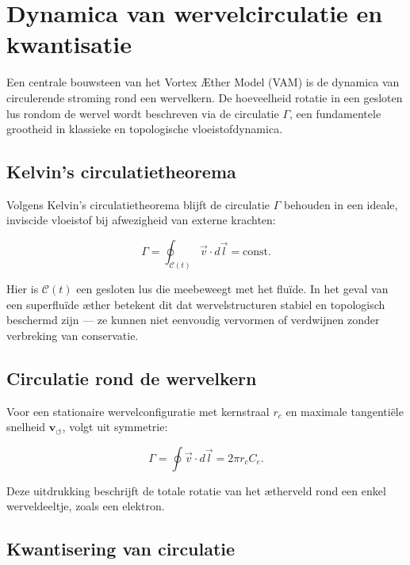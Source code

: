 
\section{Dynamica van wervelcirculatie en kwantisatie}\label{sec:appendix_4}

Een centrale bouwsteen van het Vortex Æther Model (VAM) is de dynamica van circulerende stroming rond een wervelkern. De hoeveelheid rotatie in een gesloten lus rondom de wervel wordt beschreven via de circulatie \( \Gamma \), een fundamentele grootheid in klassieke en topologische vloeistofdynamica.

\subsection{Kelvin's circulatietheorema}

Volgens Kelvin's circulatietheorema blijft de circulatie \( \Gamma \) behouden in een ideale, inviscide vloeistof bij afwezigheid van externe krachten:

\begin{equation}
\Gamma = \oint_{\mathcal{C}(t)} \vec{v} \cdot d\vec{l} = \text{const.}
\end{equation}

Hier is \( \mathcal{C}(t) \) een gesloten lus die meebeweegt met het fluïde. In het geval van een superfluïde æther betekent dit dat wervelstructuren stabiel en topologisch beschermd zijn — ze kunnen niet eenvoudig vervormen of verdwijnen zonder verbreking van conservatie.

\subsection{Circulatie rond de wervelkern}

Voor een stationaire wervelconfiguratie met kernstraal \( r_c \) en maximale tangentiële snelheid \( \mathbf{v}_{\scriptscriptstyle\boldsymbol{\circlearrowleft}} \), volgt uit symmetrie:

\begin{equation}
\Gamma = \oint \vec{v} \cdot d\vec{l} = 2\pi r_c C_e.
\end{equation}

Deze uitdrukking beschrijft de totale rotatie van het ætherveld rond een enkel werveldeeltje, zoals een elektron.

\subsection{Kwantisering van circulatie}

